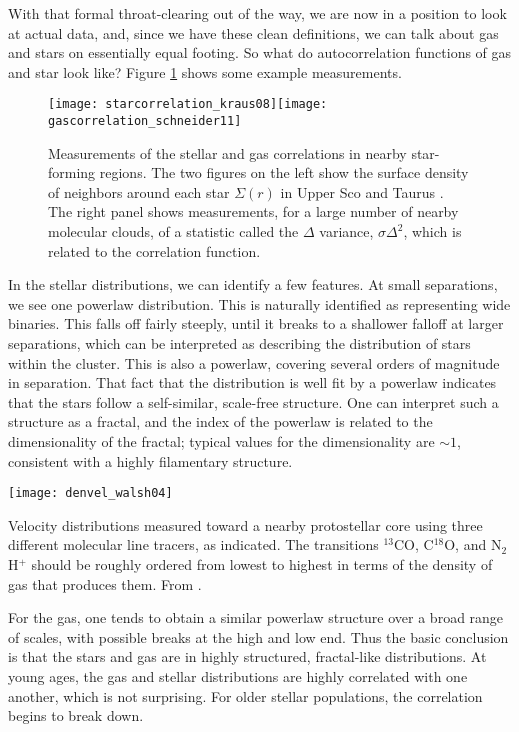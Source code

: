 With that formal throat-clearing out of the way, we are now in a position to look at actual data, and, since we have these clean definitions, we can talk about gas and stars on essentially equal footing. So what do autocorrelation functions of gas and star look like? Figure \ref{fig:correlation_stargas} shows some example measurements.

\begin{figure}
\texttt{[image: starcorrelation\_kraus08]}\texttt{[image: gascorrelation\_schneider11]}
\caption[Correlation functions for gas and stars]{
\label{fig:correlation_stargas}
Measurements of the stellar and gas correlations in nearby star-forming regions. The two figures on the left show the surface density of neighbors around each star $\Sigma(r)$ in Upper Sco and Taurus \citep{kraus08a}. The right panel shows measurements, for a large number of nearby molecular clouds, of a statistic called the $\Delta$ variance, $\sigma \Delta^2$, which is related to the correlation function.
}
\end{figure}

In the stellar distributions, we can identify a few features. At small separations, we see one powerlaw distribution. This is naturally identified as representing wide binaries. This falls off fairly steeply, until it breaks to a shallower falloff at larger separations, which can be interpreted as describing the distribution of stars within the cluster. This is also a powerlaw, covering several orders of magnitude in separation. That fact that the distribution is well fit by a powerlaw indicates that the stars follow a self-similar, scale-free structure. One can interpret such a structure as a fractal, and the index of the powerlaw is related to the dimensionality of the fractal; typical values for the dimensionality are $\sim 1$, consistent with a highly filamentary structure.

\begin{marginfigure}
\texttt{[image: denvel\_walsh04]}
\caption[Velocity distributions in varying molecular lines]{
\label{fig:denvel_walsh04}
Velocity distributions measured toward a nearby protostellar core using three different molecular line tracers, as indicated. The transitions $^{13}$CO, C$^{18}$O, and N$_2$H$^+$ should be roughly ordered from lowest to highest in terms of the density of gas that produces them. From \citet{walsh04a}.
}
\end{marginfigure}

For the gas, one tends to obtain a similar powerlaw structure over a broad range of scales, with possible breaks at the high and low end. Thus the basic conclusion is that the stars and gas are in highly structured, fractal-like distributions. At young ages, the gas and stellar distributions are highly correlated with one another, which is not surprising. For older stellar populations, the correlation begins to break down.

